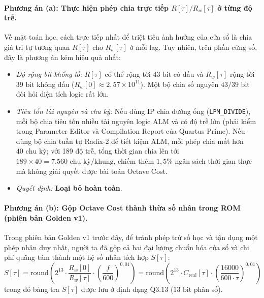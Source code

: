 \paragraph{Phương án (a): Thực hiện phép chia trực tiếp $R[\tau] / R_w[\tau]$ ở từng độ trễ.}
Về mặt toán học, cách trực tiếp nhất để triệt tiêu ảnh hưởng của cửa sổ là chia giá trị tự tương quan $R[\tau]$ cho $R_w[\tau]$ ở mỗi lag. Tuy nhiên, trên phần cứng số, đây là phương án kém hiệu quả nhất:
\begin{itemize}[leftmargin=1.5em, itemsep=2pt]
    \item \emph{Độ rộng bit khổng lồ:} $R[\tau]$ có thể rộng tới $43\text{ bit}$ có dấu và $R_w[\tau]$ rộng tới $39\text{ bit}$ không dấu ($R_w[0] \approx 2{,}57 \times 10^{11}$). Một bộ chia số nguyên $43 / 39\text{ bit}$ đòi hỏi diện tích logic rất lớn.
    \item \emph{Tiêu tốn tài nguyên và chu kỳ:} Nếu dùng IP chia đường ống (\texttt{LPM\_DIVIDE}), mỗi bộ chia tiêu tốn nhiều tài nguyên logic ALM và có độ trễ lớn (phải kiểm trong Parameter Editor và Compilation Report của Quartus Prime). Nếu dùng bộ chia tuần tự Radix-2 để tiết kiệm ALM, mỗi phép chia mất hơn $40\text{ chu kỳ}$; với 189 độ trễ, tổng thời gian chia lên tới $189 \times 40 = 7.560\text{ chu kỳ/khung}$, chiếm thêm $1{,}5\%$ ngân sách thời gian thực mà không giải quyết được bài toán Octave Cost.
    \item \emph{Quyết định:} \textbf{Loại bỏ hoàn toàn}.
\end{itemize}

\paragraph{Phương án (b): Gộp Octave Cost thành thừa số nhân trong ROM (phiên bản Golden v1).}
Trong phiên bản Golden v1 trước đây, để tránh phép trừ số học và tận dụng một phép nhân duy nhất, người ta đã gộp cả hai đại lượng chuẩn hóa cửa sổ và chi phí quãng tám thành một hệ số nhân tích hợp $S[\tau]$:
\begin{equation}
S[\tau] = \text{round}\left( 2^{13} \cdot \frac{R_w[0]}{R_w[\tau]} \cdot \left(\frac{f}{600}\right)^{0{,}01} \right) = \text{round}\left( 2^{13} \cdot C_{\text{real}}[\tau] \cdot \left(\frac{16000}{600 \cdot \tau}\right)^{0{,}01} \right)
\label{eq:ch08_s_mult_def}
\end{equation}
trong đó bảng tra $S[\tau]$ được lưu ở định dạng Q3.13 ($13\text{ bit}$ phân số).

